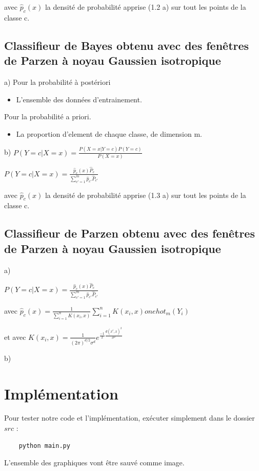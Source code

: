 \documentclass[a4paper,10pt]{article}
\begin{document}
avec $ \hat{p}_{c}(x) $ la densité de probabilité apprise (1.2 a) sur tout les points de la classe c.

\subsection{Classifieur de Bayes obtenu avec des fenêtres de Parzen à noyau Gaussien isotropique}

a) Pour la probabilité à postériori
\begin{itemize}
	\item L'ensemble des données d'entrainement.
\end{itemize}

Pour la probabilité a priori.
\begin{itemize}
	\item La proportion d'element de chaque classe, de dimension m.
\end{itemize}

b) $P(Y=c | X=x)  = \frac{P(X=x | Y=c) P(Y=c)}{P(X=x)} $

$P(Y=c | X=x)  = \frac{ \hat{p}_{c}(x) \hat{P}_{c}}{ \sum_{c'=1}^{m} \hat{p}_{c'} \hat{P}_{c'} } $

avec $ \hat{p}_{c}(x) $ la densité de probabilité apprise (1.3 a) sur tout les points de la classe c.


\subsection{Classifieur de Parzen obtenu avec des fenêtres de Parzen à noyau Gaussien isotropique}

a)

$P(Y=c | X=x)  = \frac{ \hat{p}_{c}(x) \hat{P}_{c}}{ \sum_{c'=1}^{m} \hat{p}_{c'} \hat{P}_{c'} } $

avec $ \hat{p}_{c}(x) =  \frac{1}{ \sum_{i=1}^{n} K(x_{i}, x) } \sum_{i=1}^{n} K(x_{i}, x) onehot_{m}(Y_{i}) $

et avec $ K(x_{i}, x) = \frac{1}{ (2 \pi)^{d/2} \sigma^{d}}  e^{ \frac{-1}{2} \frac{d(x^{i},x)^{2}}{\sigma^{2}}} $ 


b)

\section{Implémentation}

Pour tester notre code et l'implémentation, exécuter simplement dans le dossier $src$ :
\begin{verbatim}
	python main.py
\end{verbatim}
L'ensemble des graphiques vont être sauvé comme image.
\end{document}
